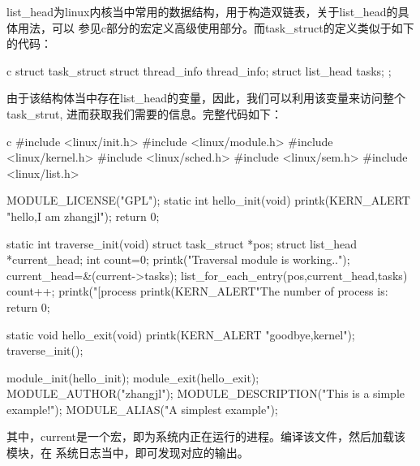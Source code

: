 list\_head为linux内核当中常用的数据结构，用于构造双链表，关于list\_head的具体用法，可以
参见c部分的宏定义高级使用部分。而task\_struct的定义类似于如下的代码：
\begin{code-block}{c}
struct task_struct {
        struct thread_info    thread_info;
        struct list_head      tasks;
};
\end{code-block}

由于该结构体当中存在list\_head的变量，因此，我们可以利用该变量来访问整个task\_strut,
进而获取我们需要的信息。完整代码如下：
\begin{code-block}{c}
#include <linux/init.h>
#include <linux/module.h>
#include <linux/kernel.h>
#include <linux/sched.h>
#include <linux/sem.h>
#include <linux/list.h>

MODULE_LICENSE("GPL");
static int hello_init(void)
{
        printk(KERN_ALERT "hello,I am zhangjl\n");
        return 0;
}

static int traverse_init(void)
{
       struct task_struct *pos;
       struct list_head *current_head;
       int count=0;
       printk("Traversal module is working..\n");
       current_head=&(current->tasks);
       list_for_each_entry(pos,current_head,tasks)
       {
              count++;
              printk("[process %
       }
       printk(KERN_ALERT"The number of process is:%
       return 0;
}

static void hello_exit(void)
{
    printk(KERN_ALERT "goodbye,kernel\n");
    traverse_init();
}

module_init(hello_init);
module_exit(hello_exit);
MODULE_AUTHOR("zhangjl");
MODULE_DESCRIPTION("This is a simple example!\n");
MODULE_ALIAS("A simplest example");

\end{code-block}

其中，current是一个宏，即为系统内正在运行的进程。编译该文件，然后加载该模块，在
系统日志当中，即可发现对应的输出。

